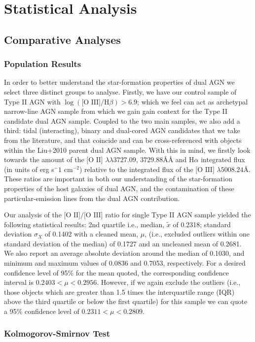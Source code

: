 \section{Statistical Analysis}
\subsection{Comparative Analyses}
\subsubsection{Population Results}

In order to better understand the star-formation properties of dual AGN we select three distinct groups to analyse. Firstly, we have our control sample of Type II AGN with $\log{(\text{[O III]}/\text{H}\beta)}>{6.9}$; which we feel can act as archetypal narrow-line AGN sample from which we gain gain context for the Type II candidate dual AGN sample. Coupled to the two main samples, we also add a third: tidal (interacting), binary and dual-cored AGN candidates that we take from the literature, and that coincide and can be cross-referenced with objects within the Liu+2010 parent dual AGN sample. With this in mind, we firstly look towards the amount of the $\text{[O II]}$ $\lambda\lambda$$3727.09$, $3729.88$\AA\AA{} and $\text{H}\alpha$ integrated flux (in units of erg s${^-1}$ cm$^{-2}$) relative to the integrated flux of the $\text{[O III]}$ $\lambda$$5008.24$\AA. These ratios are important in both our understanding of the star-formation properties of the host galaxies of dual AGN, and the contamination of these particular-emission lines from the dual AGN contribution.

Our analysis of the $\text{[O II]/[O III]}$ ratio for single Type II AGN sample yielded the following statistical results: 2nd quartile i.e., median, $\tilde{x}$ of 0.2318; standard deviation $\sigma_{X}$ of 0.1402 with a cleaned mean, $\mu$, (i.e., excluded outliers within one standard deviation of the median) of 0.1727 and an uncleaned mean of 0.2681. We also report an average absolute deviation around the median of 0.1030, and minimum and maximum values of 0.0836 and 0.7053, respectively. For a desired confidence level of 95\% for the mean quoted, the corresponding confidence interval is ${0.2403}<{\mu}<{0.2956}$. However, if we again exclude the outliers (i.e., those objects which are greater than 1.5 times the interquartile range (IQR) above the third quartile or below the first quartile) for this sample we can quote a 95\% confidence level of ${0.2311}<{\mu}<{0.2809}$. 

\subsubsection{Kolmogorov-Smirnov Test}
  
  